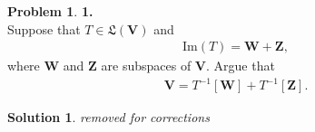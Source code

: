 \documentclass{article}
\theoremstyle{definition}
\newtheorem*{prob*}{Problem}
\newtheorem*{sln*}{Solution}
\newcommand{\V}{\mathbf{V}}
\newcommand{\W}{\mathbf{W}}
\newcommand{\Z}{\mathbf{Z}}
\newcommand{\ima}{\text{Im}}
\begin{document}
\begin{prob*}\textbf{1.} \\
	
	Suppose that $T \in \mathfrak{L}(\V)$ and
	\begin{align*}
	\ima(T)= \W + \Z,
	\end{align*}
	where $\W$ and $\Z$ are subspaces of $\V$. Argue that
	\begin{align*}
	\V = T^{-1}[\W] + T^{-1}[\Z].
	\end{align*}
	
	\begin{sln*}
		\textit{removed for corrections}
	\end{sln*}
	
%		
\end{prob*}


\newpage
\end{document}

